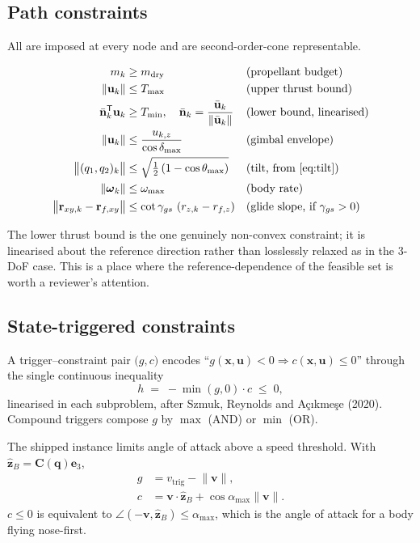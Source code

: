 \documentclass[11pt,a4paper]{article}
\newcommand{\vect}[1]{\mathbf{#1}}
\newcommand{\quat}[1]{\mathbf{#1}}
\newcommand{\Rot}{\vect{C}}
\begin{document}
\subsection{Path constraints}

All are imposed at every node and are second-order-cone representable.

\begin{align}
m_k &\ge m_{\mathrm{dry}} && \text{(propellant budget)} \\
\lVert\vect{u}_k\rVert &\le T_{\max} && \text{(upper thrust bound)} \\
\bar{\vect{n}}_k^{\mathsf{T}}\vect{u}_k &\ge T_{\min},
  \quad \bar{\vect{n}}_k=\frac{\bar{\vect{u}}_k}{\lVert\bar{\vect{u}}_k\rVert}
  && \text{(lower bound, linearised)} \\
\lVert\vect{u}_k\rVert &\le \frac{u_{k,z}}{\cos\delta_{\max}}
  && \text{(gimbal envelope)} \\
\bigl\lVert(q_1,q_2)_k\bigr\rVert &\le \sqrt{\tfrac{1}{2}\left(1-\cos\theta_{\max}\right)}
  && \text{(tilt, from \eqref{eq:tilt})} \\
\lVert\boldsymbol{\omega}_k\rVert &\le \omega_{\max}
  && \text{(body rate)} \\
\bigl\lVert \vect{r}_{xy,k}-\vect{r}_{f,xy}\bigr\rVert
  &\le \cot\gamma_{gs}\,\left(r_{z,k}-r_{f,z}\right)
  && \text{(glide slope, if } \gamma_{gs}>0)
\end{align}

The lower thrust bound is the one genuinely non-convex constraint; it is
linearised about the reference direction rather than losslessly relaxed as in
the 3-DoF case. This is a place where the reference-dependence of the feasible
set is worth a reviewer's attention.

\subsection{State-triggered constraints}

A trigger--constraint pair $\bigl(g,c\bigr)$ encodes
``$g(\vect{x},\vect{u})<0 \Rightarrow c(\vect{x},\vect{u})\le 0$'' through the
single continuous inequality
\begin{equation}
h \;=\; -\min\!\left(g,0\right)\cdot c \;\le\; 0,
\end{equation}
linearised in each subproblem, after Szmuk, Reynolds and A\c{c}{\i}kme\c{s}e
(2020). Compound triggers compose $g$ by $\max$ (AND) or $\min$ (OR).

The shipped instance limits angle of attack above a speed threshold. With
$\hat{\vect{z}}_B=\Rot(\quat{q})\vect{e}_3$,
\begin{align}
g &= v_{\mathrm{trig}} - \lVert\vect{v}\rVert, \\
c &= \vect{v}\cdot\hat{\vect{z}}_B + \cos\alpha_{\max}\lVert\vect{v}\rVert .
\end{align}
$c\le0$ is equivalent to $\angle(-\vect{v},\hat{\vect{z}}_B)\le\alpha_{\max}$,
which is the angle of attack for a body flying nose-first.
\end{document}
